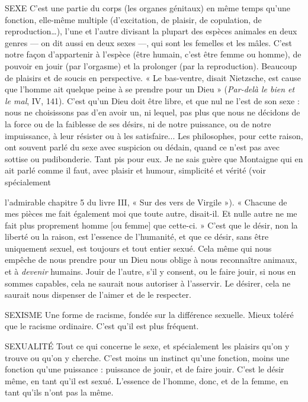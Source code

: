 SEXE C’est une partie du corps (les organes génitaux) en même temps
qu’une fonction, elle-même multiple (d’excitation, de plaisir, de
copulation, de reproduction…), l’une et l’autre divisant la plupart des espèces
animales en deux genres — on dit aussi en deux sexes —, qui sont les femelles et
les mâles. C’est notre façon d’appartenir à l'espèce (être humain, c’est être
femme ou homme), de pouvoir en jouir (par l’orgasme) et la prolonger (par la
reproduction). Beaucoup de plaisirs et de soucis en perspective.
« Le bas-ventre, disait Nietzsche, est cause que l’homme ait quelque peine
à se prendre pour un Dieu » ({\it Par-delà le bien et le mal}, IV, 141). C’est qu'un
Dieu doit être libre, et que nul ne l’est de son sexe : nous ne choisissons pas
d’en avoir un, ni lequel, pas plus que nous ne décidons de la force ou de la faiblesse
de ses désirs, ni de notre puissance, ou de notre impuissance, à leur
résister ou à les satisfaire... Les philosophes, pour cette raison, ont souvent
parlé du sexe avec suspicion ou dédain, quand ce n’est pas avec sottise ou pudibonderie.
Tant pis pour eux. Je ne sais guère que Montaigne qui en ait parlé
comme il faut, avec plaisir et humour, simplicité et vérité (voir spécialement

l’admirable chapitre 5 du livre III, « Sur des vers de Virgile »). « Chacune de
mes pièces me fait également moi que toute autre, disait-il. Et nulle autre ne
me fait plus proprement homme [ou femme] que cette-ci. » C’est que le désir,
non la liberté ou la raison, est l’essence de l'humanité, et que ce désir, sans être
uniquement sexuel, est toujours et tout entier sexué. Cela même qui nous
empêche de nous prendre pour un Dieu nous oblige à nous reconnaître animaux,
et à {\it devenir} humains. Jouir de l’autre, s’il y consent, ou le faire jouir, si
nous en sommes capables, cela ne saurait nous autoriser à l’asservir. Le désirer,
cela ne saurait nous dispenser de l’aimer et de le respecter.

SEXISME Une forme de racisme, fondée sur la différence sexuelle. Mieux
toléré que le racisme ordinaire. C’est qu’il est plus fréquent.

SEXUALITÉ Tout ce qui concerne le sexe, et spécialement les plaisirs qu’on
y trouve ou qu'on y cherche. C’est moins un instinct qu’une
fonction, moins une fonction qu’une puissance : puissance de jouir, et de faire
jouir. C’est le désir même, en tant qu’il est sexué. L’essence de l’homme, donc,
et de la femme, en tant qu’ils n’ont pas la même.

